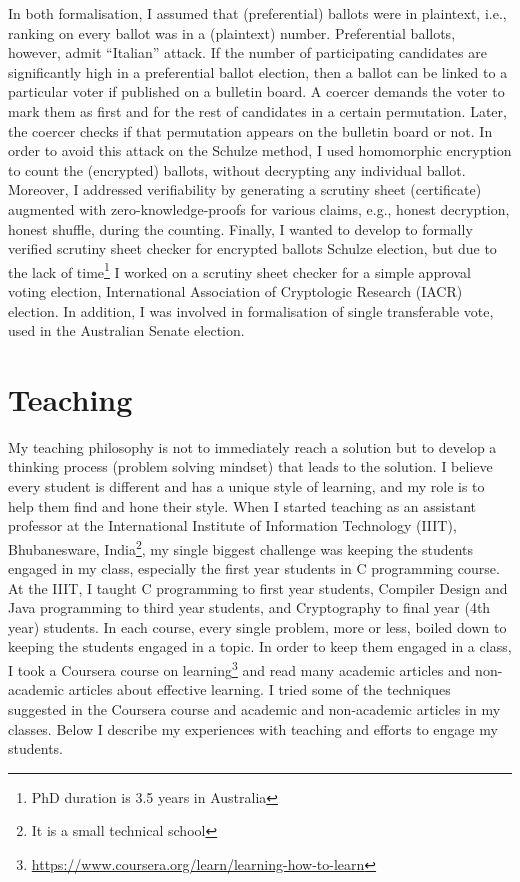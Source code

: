 \documentclass[a4paper]{article}
\begin{document}
In both formalisation, I assumed that (preferential) ballots were in plaintext, i.e., 
ranking on every ballot was in a (plaintext) number.  Preferential ballots, 
however, admit ``Italian'' attack. 
If the number of participating candidates are significantly high in 
a preferential ballot election,
then a ballot can be linked to a particular voter if published on a bulletin board.
A coercer demands the voter to mark them as first and for the rest of candidates
in a certain permutation. Later, the coercer checks if that permutation appears 
on the bulletin board or not. In order to
avoid this attack on the Schulze method, I used homomorphic encryption to count the (encrypted) ballots, without decrypting 
any individual ballot. Moreover, I addressed verifiability by generating a scrutiny sheet (certificate) 
augmented with zero-knowledge-proofs for various claims, e.g., honest decryption, honest shuffle,  
during the counting. 
Finally, I wanted to develop to formally 
verified scrutiny sheet checker for encrypted ballots Schulze election, but due to the lack of 
time\footnote{PhD duration is 3.5 years in Australia} I worked on a scrutiny sheet checker for a simple approval voting election,
International Association of Cryptologic Research (IACR) election.
In addition, I was involved in formalisation of single transferable vote, used in the Australian Senate election.







\section{Teaching}
My teaching philosophy is not to immediately reach a solution but to develop a 
thinking process (problem solving mindset) that leads to the solution. I believe every 
student is different and has a unique style of learning, and my role is to help them find 
and hone their style. When I started teaching as an assistant professor at the International Institute of Information 
Technology (IIIT), Bhubanesware, India\footnote{It is a small technical school},
my single biggest challenge was keeping the students engaged in my class, especially the first year 
students in C programming course. At the IIIT, I taught C programming to 
first year students, Compiler Design and Java programming to third year students, and
Cryptography to final year (4th year) students. In each course, every single 
problem,  more or less, boiled down to keeping the students engaged in a topic. 
In order to keep them engaged in a class, I took a Coursera course on 
learning\footnote{\url{https://www.coursera.org/learn/learning-how-to-learn}} and 
read many academic articles and non-academic articles about effective learning.
I tried some of the techniques suggested in the Coursera course and 
academic and non-academic articles in my classes. Below I 
describe my experiences with teaching and efforts to engage my students. 
\end{document}
